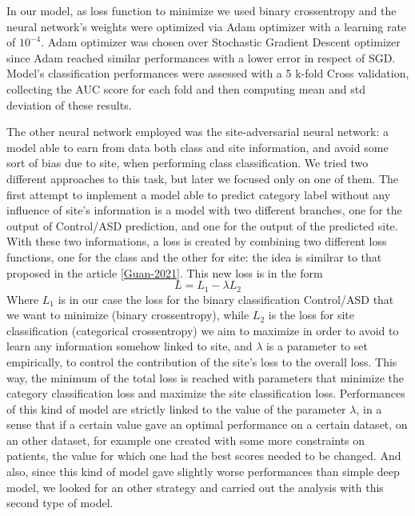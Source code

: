 \documentclass[10pt]{report}
\begin{document}
In our model, as loss function to minimize we used binary crossentropy and the neural network's weights were optimized via Adam optimizer with a learning rate of $10^{-4}$.
Adam optimizer was chosen over Stochastic Gradient Descent optimizer since Adam reached similar performances with a lower error in respect of SGD.
Model's classification performances were assessed with a 5 k-fold Cross validation, collecting the AUC score for each fold and then computing mean and std deviation of these results.


The other neural network employed was the site-adversarial neural network: a model able to earn from data both class and site information, and avoid some sort of bias due to site, when performing class classification.
We tried two different approaches to this task, but later we focused only on one of them.
The first attempt to implement a model able to predict category label without any influence of site's information is a model with two different branches, one for the output of Control/ASD prediction, and one for the output of the predicted site.
With these two informations, a loss is created by combining two different loss functions, one for the class and the other for site: the idea is similrar to that proposed in the article \ref{Guan-2021}.
This new loss is in the form
\begin{equation}
L = L_1 - \lambda L_2
\end{equation}
Where $L_1$  is in our case the loss for the binary classification Control/ASD that we want to minimize (binary crossentropy), while $L_2$ is the loss for site classification (categorical crossentropy) we aim to maximize in order to avoid to learn any information somehow linked to site, and $\lambda $ is a parameter to set empirically, to control the contribution of the site's loss to the overall loss.
This way, the minimum of the total loss is reached with parameters that minimize the category classification loss and maximize the site classification loss.
Performances of this kind of model are strictly linked to the value of the parameter $\lambda$, in a sense that if a certain value gave an optimal performance on a certain dataset, on an other dataset, for example one created with some more constraints on patients, the value for which one had the best scores needed to be changed.
And also, since this kind of model gave slightly worse performances than simple deep model, we looked for an other strategy and carried out the analysis with this second type of model.
\end{document}
